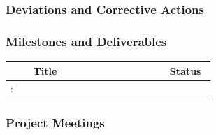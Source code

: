 \subsubsection*{Deviations and Corrective Actions}


\subsubsection*{Milestones and Deliverables}

{\fontsize{9}{11}\selectfont
\begin{center}
  \begin{tabular}[t]{!{\color{mygray}\vrule}p{0.10\linewidth}!
  {\color{mygray}\vrule}p{0.60\linewidth}!
  {\color{mygray}\vrule}p{0.20\linewidth}!{\color{mygray}\vrule} } \hline
     & {\bf Title} & {\bf Status} \\ \hline
    : &  &  \\ \hline
  \end{tabular}
\end{center}
}


\subsubsection*{Project Meetings}


